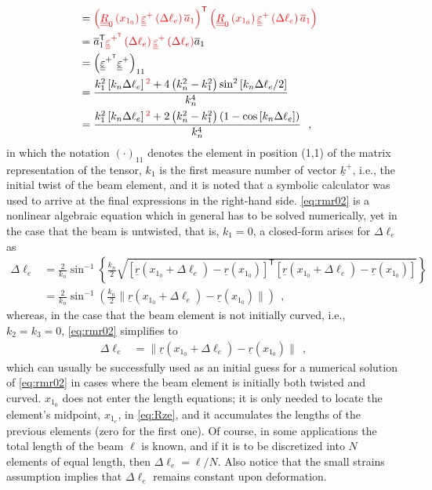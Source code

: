 \documentclass[12pt,a4paper,oneside,english]{abntex2} %
\newcommand{\fix}[1]{{\color{red}#1}}
\newcommand{\vect}[1]{\underline{#1}}
\newcommand{\uvec}[1]{\overline{#1}}
\def\tens#1{\underline{\underline{#1}}}
\def\lb{\left[}
\def\rb{\right]}
\def\lp{\left(}
\def\rp{\right)}
\def\T{\mathsf{T}}
\def\aone{\uvec{a}_1}
\def\R{\tens{R}}
\def\Rz{\R_0}
\def\r{\vect{r}}
\def\k{\vect{k}}
\def\kp{\k^{+}}
\def\Deltal{\Delta \ell_e}
\def\xom{x_{1_e}}
\def\xoz{x_{1_0}}
\def\kn{k_{n}}
\def\knt{\kn^2}
\def\varepsten{\tens{\varepsilon}}
\def\varepstenp{\varepsten^+}
\def\varepstenpT{\varepsten^{+^\T}}
\begin{document}
\begin{apendicesenv}
\begin{align}
    \nonumber \\
    &= \fix{\lp\Rz\lp\xoz\rp\varepstenp\lp\Deltal\rp\aone\rp^\T\lp\Rz\lp\xoz\rp\varepstenp\lp\Deltal\rp\aone\rp}
    \nonumber \\
    &= \aone^\T\fix{\varepstenpT\lp\Deltal\rp\varepstenp\lp\Deltal\rp}\aone
    \nonumber \\
    &= \lp\varepstenpT\varepstenp\rp_{11}
    \nonumber \\
    &= \frac{k_1^2\lb\kn\Deltal\rb\fix{^2} + 4\lp\knt-k_1^2\rp\sin^2\lb\kn\Deltal/2\rb}{\kn^4}
    \nonumber \\
    &= \frac{k_1^2\lb\kn\Deltal\rb\fix{^2} + 2\lp\knt-k_1^2\rp\lp1-\cos\lb\kn\Deltal\rb\rp}{\kn^4} \ \ ,
    \label{eq:rmr02}
\end{align}
in which the notation $\lp\cdot\rp_{11}$ denotes the element in position (1,1) of the matrix representation of the tensor, $k_1$ is the first measure number of vector $\kp$, i.e., the initial twist of the beam element, and it is noted that a symbolic calculator was used to arrive at the final expressions in the right-hand side. \cref{eq:rmr02} is a nonlinear algebraic equation which in general has to be solved numerically, yet in the case that the beam is untwisted, that is, $k_1 = 0$, a closed-form arises for $\Deltal$ as
\begin{align}
    \Deltal &= \frac{2}{\kn}\sin^{-1}\left\{\frac{\kn}{2}\sqrt{\lb\r\lp\xoz+\Deltal\rp-\r\lp\xoz\rp\rb^\T \lb\r\lp\xoz+\Deltal\rp-\r\lp\xoz\rp\rb}\right\}
    \nonumber 
    \\
    &= \frac{2}{\kn}\sin^{-1}\lp\frac{\kn}{2}\lVert\r\lp\xoz+\Deltal\rp-\r\lp\xoz\rp\rVert\rp \ \ , 
    \label{eq:Deltal_k10}
\end{align}
whereas, in the case that the beam element is not initially curved, i.e., $k_2=k_3=0$, \cref{eq:rmr02} simplifies to  
\begin{align}
    \Deltal &= \lVert\r\lp\xoz+\Deltal\rp-\r\lp\xoz\rp\rVert \ \ ,
    \label{eq:Deltal_k230}
\end{align}
which can usually be successfully used as an initial guess for a numerical solution of \cref{eq:rmr02} in cases where the beam element is initially both twisted and curved. \fix{$\xoz$ does not enter the length equations; it is only needed to locate the element's midpoint, $\xom$, in \cref{eq:Rze}, and it accumulates the lengths of the previous elements (zero for the first one).} Of course, in some applications the total length of the beam $\ell$ is known, and if it is to be discretized into $N$ elements of equal length, then $\Deltal = \ell/N$. Also notice that the small strains assumption implies that $\Deltal$ remains constant upon deformation.


\end{apendicesenv}
\end{document}
